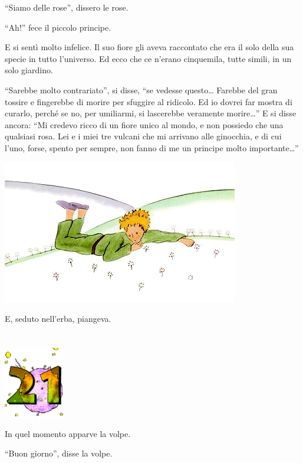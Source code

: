 \documentclass[11pt]{scrbook}
\begin{document}
``Siamo delle rose'', dissero le rose.

``Ah!'' fece il piccolo principe.

E si sentì molto infelice. Il suo fiore gli aveva raccontato che era il solo della sua specie in tutto l'universo. Ed ecco che ce n'erano cinquemila, tutte simili, in un solo giardino.

``Sarebbe molto contrariato'', si disse, ``se vedesse questo\ldots{} Farebbe del gran tossire e fingerebbe di morire per sfuggire al ridicolo. Ed io dovrei far mostra di curarlo, perché se no, per umiliarmi, si lascerebbe veramente morire\ldots{}'' E si disse ancora: ``Mi credevo ricco di un fiore unico al mondo, e non possiedo che una qualsiasi rosa. Lei e i miei tre vulcani che mi arrivano alle ginocchia, e di cui l'uno, forse, spento per sempre, non fanno di me un principe molto importante\ldots{}''

\begin{center}
\includegraphics{img/20b}
\end{center}

E, seduto nell'erba, piangeva.

\chapter{}
\begin{center}
\includegraphics{img/chapter21}
\end{center}

In quel momento apparve la volpe.

``Buon giorno'', disse la volpe.
\end{document}
